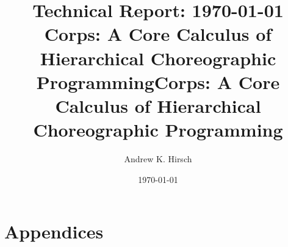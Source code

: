 \documentclass[acmsmall,review,anonymous]{acmart}
\title[Corps]{{\small Technical Report: \hfill \today}\\ Corps: A Core Calculus of Hierarchical Choreographic Programming}
\date{\today}
\title{Corps: A Core Calculus of Hierarchical Choreographic Programming}
\date{}
\author{Andrew K. Hirsch}
\affiliation{
    \institution{University at Buffalo}
    \city{Buffalo}
    \country{USA}
  }
\begin{document}
\begin{abstract}
  
\end{abstract}



\maketitle


\iftr
  \appendix
  \section*{Appendices}
  

\fi  
  
\end{document}
